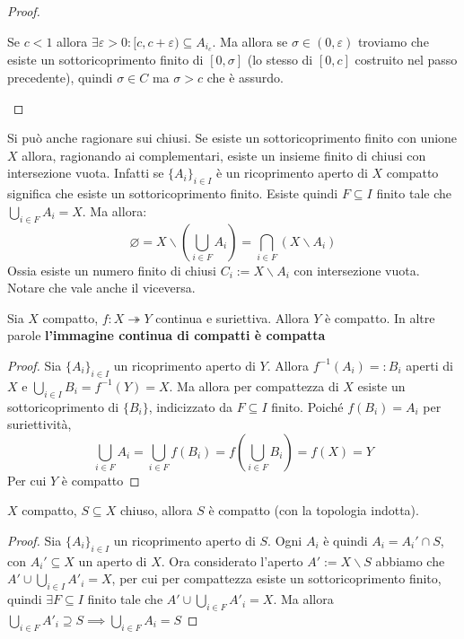 \begin{example}
\begin{proof}
\begin{enumerate}[label = \alph*.]
        Se \(c < 1\) allora \(\exists \varepsilon > 0: [c, c + \varepsilon)
        \subseteq A_{i_c} \). Ma allora se \(\sigma \in (0, \varepsilon)\)
        troviamo che esiste un sottoricoprimento finito di \([0, \sigma]\) (lo
        stesso di \([0, c]\) costruito nel passo precedente), quindi \(\sigma
        \in C\) ma \(\sigma > c\) che è assurdo.
\end{enumerate}
\end{proof}
\end{example}
\begin{remark}
    Si può anche ragionare sui chiusi. Se esiste un sottoricoprimento finito con
    unione \(X\) allora, ragionando ai complementari, esiste un insieme finito
    di chiusi con intersezione vuota.
    Infatti se \(\{{A_{i}}\}_{i \in  I}\) è un ricoprimento aperto di \(X\)
    compatto significa che esiste un sottoricoprimento finito. Esiste quindi \(F
    \subseteq I \) finito tale che \(\bigcup_{i \in  F} A_{i} = X\). Ma allora:
    \[
        \varnothing = X \smallsetminus \left(\bigcup_{i \in F}A_{i} \right) = \bigcap_{i
        \in F} \left(X \smallsetminus A_{i}\right)
    \]
    Ossia esiste un numero finito di chiusi \(C_{i} := X \smallsetminus A_{i}\)
    con intersezione vuota. Notare che vale anche il viceversa.
\end{remark}
\begin{proposition}
    Sia \(X\) compatto, \(f: X \twoheadrightarrow Y\) continua e suriettiva.
    Allora \(Y\) è compatto. In altre parole \textbf{l'immagine continua di
    compatti è compatta}
\end{proposition}
\begin{proof}
    Sia \(\{A_{i}\}_{i \in I}\) un ricoprimento aperto di \(Y\). Allora
    \(f^{-1}(A_{i}) =: B_{i}\) aperti di \(X\) e \(\bigcup_{i \in  I} B_{i} =
    f^{-1}(Y) = X\). Ma allora per compattezza di \(X\) esiste un
    sottoricoprimento di \(\{B_{i}\} \), indicizzato da \(F \subseteq I \)
    finito. Poiché \(f(B_{i}) = A_{i}\) per suriettività, 
    \[
        \bigcup_{i \in F} A_{i} = \bigcup_{i \in F} f\left( B_{i} \right) =
        f\left( \bigcup_{i \in F} B_{i} \right) = f\left( X \right) = Y 
    \]
    Per cui \(Y\) è compatto
\end{proof}
\begin{proposition}
    \(X\) compatto, \(S \subseteq X \) chiuso, allora \(S\) è compatto (con la
    topologia indotta).
\end{proposition}
\begin{proof}
    Sia \(\{A_{i}\}_{i \in I}\) un ricoprimento aperto di \(S\). Ogni \(A_{i}\)
    è quindi \(A_{i} = A_{i}' \cap S\), con \(A_{i}' \subseteq X \) un aperto di
    \(X\). Ora considerato l'aperto \(A' := X \smallsetminus S\) abbiamo che
    \(A' \cup \bigcup_{i \in  I} A'_i = X\), per cui per compattezza esiste un
    sottoricoprimento finito, quindi \(\exists F \subseteq I \) finito tale che
    \(A' \cup \bigcup_{i \in F} A'_i = X\). Ma allora \(\bigcup_{i \in F} A'_i
    \supseteq S \implies \bigcup_{i \in F} A_{i} = S \) 
\end{proof}
